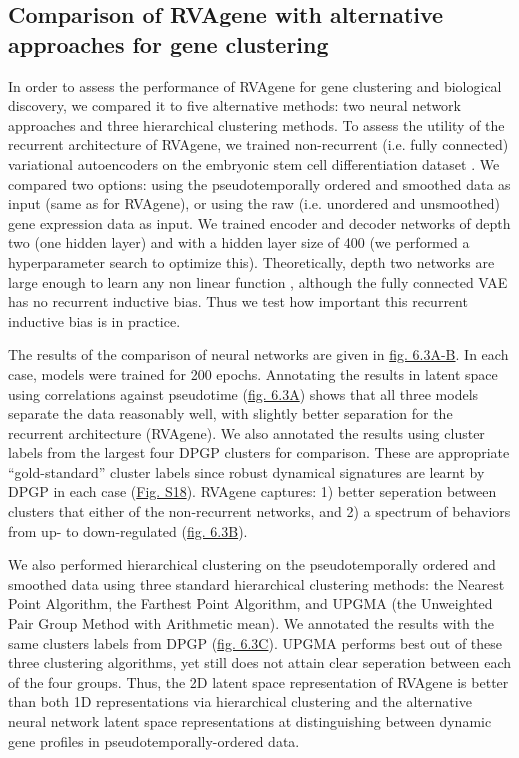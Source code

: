 \subsection{Comparison of RVAgene with alternative approaches for gene clustering}

In order to assess the performance of RVAgene for gene clustering and biological discovery, we compared it to five alternative methods: two neural network approaches and three hierarchical clustering methods. To assess the utility of the recurrent architecture of RVAgene, we trained non-recurrent (i.e. fully connected) variational autoencoders on the embryonic stem cell differentiation dataset \citep{Klein2015}. We compared two options: using the pseudotemporally ordered and smoothed data as input (same as for RVAgene), or using the raw (i.e. unordered and unsmoothed) gene expression data as input. We trained encoder and decoder networks of depth two (one hidden layer) and with a hidden layer size of 400 (we performed a hyperparameter search to optimize this). Theoretically, depth two networks are large enough to learn any non linear function \citep{cybenko1989approximation, hornik1989multilayer, funahashi1989approximate, barron1994approximation}, although the fully connected VAE has no recurrent inductive bias. Thus we test how important this recurrent inductive bias is in practice. 
\par 
The results of the comparison of neural networks are given in \hyperref[fig:fig4]{fig. 6.3A-B}. In
each case, models were trained for 200 epochs. Annotating the results in latent space using
correlations against pseudotime (\hyperref[fig:fig4]{fig. 6.3A}) shows that all three models
separate the data reasonably well, with slightly better separation for the recurrent architecture
(RVAgene). We also annotated the results using cluster labels from the largest four DPGP clusters
for comparison. These are appropriate ``gold-standard'' cluster labels since robust dynamical
signatures are learnt by DPGP in each case (\hyperref[fig:figS3]{Fig. S18}). RVAgene captures: 1) better
seperation between clusters that either of the non-recurrent networks, and 2) a spectrum of
behaviors from up- to down-regulated (\hyperref[fig:fig4]{fig. 6.3B}).
\par 
We also performed hierarchical clustering on the pseudotemporally ordered and smoothed data using
three standard hierarchical clustering methods: the Nearest Point Algorithm, the Farthest Point
Algorithm, and UPGMA (the Unweighted Pair Group Method with Arithmetic mean). We annotated the
results with the same clusters labels from DPGP (\hyperref[fig:fig4]{fig. 6.3C}). UPGMA performs best out of these three clustering algorithms, yet still does not attain clear seperation between each of the four groups. Thus, the 2D latent space representation of RVAgene is better than both 1D representations via hierarchical clustering and the alternative neural network latent space representations at distinguishing between dynamic gene profiles in pseudotemporally-ordered data.



